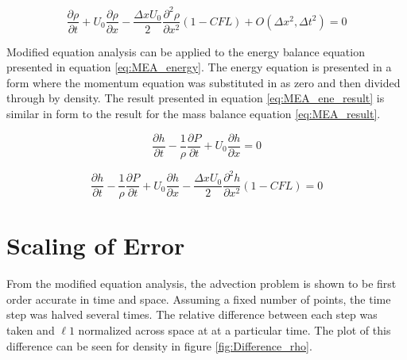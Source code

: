     \begin{equation}
    \label{eq:MEA_result}
    	 \frac{\partial \rho}{\partial t}  +  U_{0} \frac{\partial \rho}{\partial x} - 
    	 \frac{\Delta x U_{0}}{2} \frac{\partial^2 \rho}{\partial x^2}  
    	 \left(  1 - CFL  \right) 
    	 + O(\Delta x^{2},\Delta t^{2})  = 0
    \end{equation}
    
    Modified equation analysis can be applied to the energy balance equation
    presented in equation \ref{eq:MEA_energy}. The energy equation is presented in a form where
    the momentum equation was substituted in as zero and then divided through by
    density. The result presented in equation \ref{eq:MEA_ene_result} is similar in
    form to the result for the mass balance equation \ref{eq:MEA_result}.
    
    \begin{equation}
    	\label{eq:MEA_energy}
    	\frac{\partial h}{\partial t} - \frac{1}{\rho} \frac{\partial P}{\partial t} +
    	U_{0} \frac{\partial h}{\partial x} = 0
    \end{equation}
    
    \begin{equation}
    \label{eq:MEA_ene_result}
    	\frac{\partial h}{\partial t} - \frac{1}{\rho} \frac{\partial P}{\partial t} +
    	U_{0} \frac{\partial h}{\partial x} - 
    	\frac{\Delta x U_{0}}{2} \frac{\partial^2 h}{\partial x^2}
    	\left( 1 - CFL \right)
    	= 0
    \end{equation}
    
    \section{Scaling of Error}

	From the modified equation analysis, the advection problem is shown to
	be first order accurate in time and space. Assuming a fixed number of points,
	the time step was halved several times. The relative difference between each
	step was taken and $\ell 1$ normalized across space at at a particular time.
	The plot of this difference can be seen for density in figure
	\ref{fig:Difference_rho}. 
    
    
